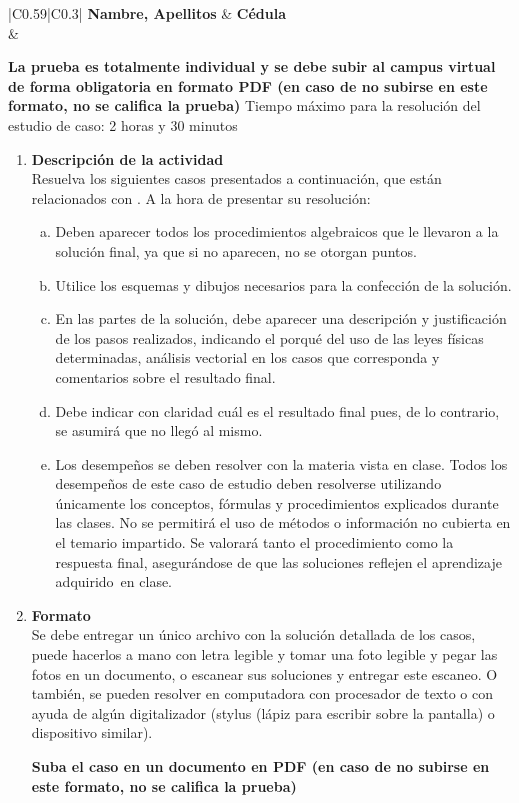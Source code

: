 \begin{center}
\begin{tabular}{|C{0.59\textwidth}|C{0.3\textwidth}|}
\hline
\textbf{Nambre, Apellitos} & \textbf{Cédula} \\ \hline
         & \\ \hline
\end{tabular}
\end{center}
\noindent
\textbf{La prueba es totalmente individual y se debe subir al campus virtual
  de forma obligatoria en formato PDF
  (en caso de no subirse en este formato, no se califica la prueba) }
Tiempo máximo para la resolución del estudio de caso: 2 horas y 30 minutos
\renewcommand{\labelenumi}{\textbf{\arabic{enumi}.}}
\begin{enumerate}
\item \textbf{Descripción de la actividad} \\
  Resuelva los siguientes casos presentados a continuación,
  que están relacionados con \topics.
  A la hora de presentar su resolución:
  \begin{enumerate}[a.]
    \item Deben aparecer todos los procedimientos algebraicos que le llevaron
      a la solución final, ya que si no aparecen, no se otorgan puntos.
    \item Utilice los esquemas y dibujos necesarios para la confección de
      la solución.
    \item En las partes de la solución, debe aparecer una descripción y
      justificación de los pasos realizados,
      indicando el porqué del uso de las leyes físicas determinadas,
      análisis vectorial en los casos que corresponda y
      comentarios sobre el resultado final.
    \item Debe indicar con claridad cuál es el resultado final pues,
      de lo contrario, se asumirá que no llegó al mismo.
    \item Los desempeños se deben resolver con la materia vista en clase.
      Todos los desempeños de este caso de estudio deben resolverse utilizando
      únicamente los conceptos, fórmulas y procedimientos explicados durante
      las clases.
      No se permitirá el uso de métodos o información no cubierta en el temario
      impartido.
      Se valorará tanto el procedimiento como la respuesta final,
      asegurándose de que las soluciones reflejen el aprendizaje adquirido en
      clase.
  \end{enumerate}
\item \textbf{Formato}\\
  Se debe entregar un único archivo con la solución detallada de los casos,
  puede hacerlos a mano con letra legible y tomar una foto legible y
  pegar las fotos en un documento,
  o escanear sus soluciones y entregar este escaneo.
  O también, se pueden resolver en computadora con procesador de texto o
  con ayuda de algún digitalizador
  (stylus (lápiz para escribir sobre la pantalla) o dispositivo similar).

  \textbf{Suba el caso en un documento en PDF
  (en caso de no subirse en este formato, no se califica la prueba)}
\end{enumerate}
